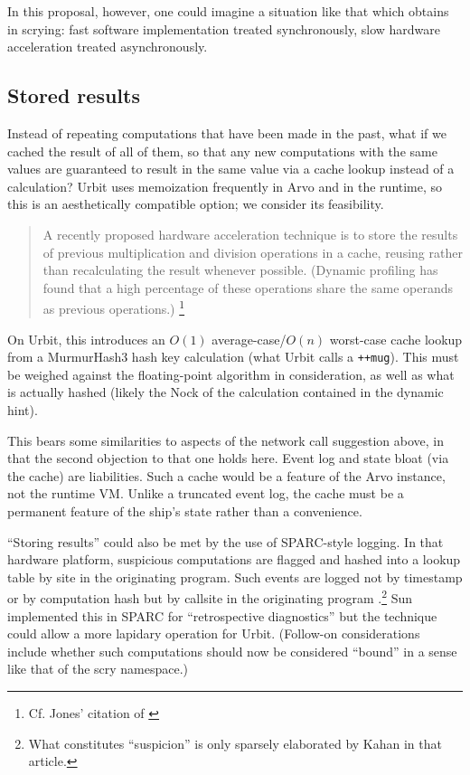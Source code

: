 \documentclass[twoside]{article}
\begin{document}
In this proposal, however, one could imagine a situation like that which obtains in scrying:  fast software implementation treated synchronously, slow hardware acceleration treated asynchronously.

\subsection{Stored results}
\label{stored-results}

Instead of repeating computations that have been made in the past, what if we cached the result of all of them, so that any new computations with the same values are guaranteed to result in the same value via a cache lookup instead of a calculation?  Urbit uses memoization frequently in Arvo and in the runtime, so this is an aesthetically compatible option; we consider its feasibility.

\begin{quote}
A recently proposed hardware acceleration technique is to store the results of previous multiplication and division operations in a cache, reusing rather than recalculating the result whenever possible. (Dynamic profiling has found that a high percentage of these operations share the same operands as previous operations.)  \citep[p.~1148]{Jones2008}\footnote{Cf. Jones' citation of \citeauthor{Citron1998}} %
\end{quote}

On Urbit, this introduces an $O(1)$ average-case/$O(n)$ worst-case cache lookup from a MurmurHash3 hash key calculation (what Urbit calls a \texttt{++mug}).  This must be weighed against the floating-point algorithm in consideration, as well as what is actually hashed (likely the Nock of the calculation contained in the dynamic hint).

This bears some similarities to aspects of the network call suggestion above, in that the second objection to that one holds here.  Event log and state bloat (via the cache) are liabilities.  Such a cache would be a feature of the Arvo instance, not the runtime VM.  Unlike a truncated event log, the cache must be a permanent feature of the ship's state rather than a convenience.

“Storing results” could also be met by the use of SPARC-style logging.  In that hardware platform, suspicious computations are flagged and hashed into a lookup table by site in the originating program.  Such events are logged not by timestamp or by computation hash but by callsite in the originating program \citep[p.~6]{Kahan1997}.\footnote{What constitutes “suspicion” is only sparsely elaborated by Kahan in that article.}  Sun implemented this in SPARC for “retrospective diagnostics” but the technique could allow a more lapidary operation for Urbit.  (Follow-on considerations include whether such computations should now be considered “bound” in a sense like that of the scry namespace.)
\end{document}
